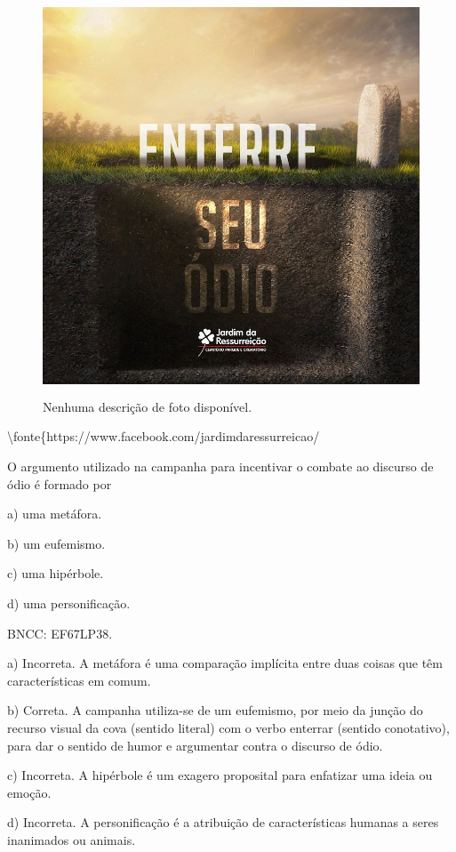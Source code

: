 \begin{figure}
\centering
\includegraphics[width=4.65833in,height=4.65833in]{./imgSAEB_6_POR/media/image35.jpeg}
\caption{Nenhuma descrição de foto disponível.}
\end{figure}

\textbackslash fonte\{https://www.facebook.com/jardimdaressurreicao/

O argumento utilizado na campanha para incentivar o combate ao discurso
de ódio é formado por

a) uma metáfora.

b) um eufemismo.

c) uma hipérbole.

d) uma personificação.

BNCC: EF67LP38.

a) Incorreta. A metáfora é uma comparação implícita entre duas coisas
que têm características em comum.

b) Correta. A campanha utiliza-se de um eufemismo, por meio da junção do
recurso visual da cova (sentido literal) com o verbo enterrar (sentido
conotativo), para dar o sentido de humor e argumentar contra o discurso
de ódio.

c) Incorreta. A hipérbole é um exagero proposital para enfatizar uma
ideia ou emoção.

d) Incorreta. A personificação é a atribuição de características humanas
a seres inanimados ou animais.

